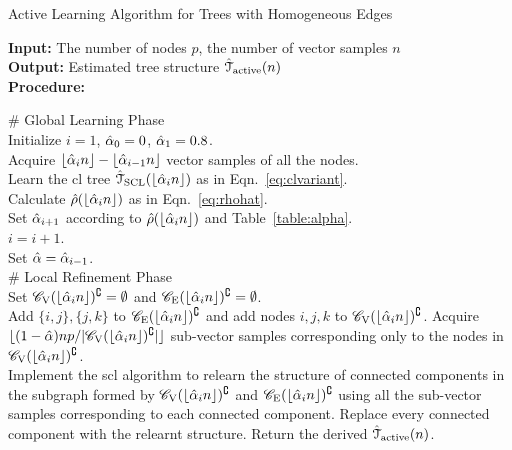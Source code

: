 \begin{algorithm}[t]
	\caption{Active Learning Algorithm for Trees with Homogeneous Edges}
	\textbf{Input:}  The number of nodes $p$, the number of vector samples $n$\\
	\textbf{Output:} Estimated tree structure $\hat{\mathcal{T}}_{{\rm active}}(n)$ \\
	\textbf{Procedure:}
	\begin{algorithmic}[1]\label{algo:alathe}
		\STATE \# Global Learning Phase\\
		\STATE Initialize $i=1$, $\hat{\alpha}_{0}=0$, $\hat{\alpha}_{1}=0.8$.\\
			\STATE Acquire $\lfloor\hat{\alpha}_{i}n\rfloor-\lfloor\hat{\alpha}_{i-1}n\rfloor$ vector samples of all the nodes.\\
			\STATE Learn the \ac{cl} tree $\hat{\mathcal{T}}_{\rm{SCL}}(\lfloor\hat{\alpha}_{i}n\rfloor)$ as in Eqn.~\eqref{eq:clvariant}.\\
			\STATE Calculate $\hat{\rho}(\lfloor\hat{\alpha}_{i}n\rfloor)$ as in Eqn.~\eqref{eq:rhohat}.\\
			\STATE Set $\hat{\alpha}_{i+1}$ according to $\hat{\rho}(\lfloor\hat{\alpha}_{i}n\rfloor)$ and Table~\ref{table:alpha}.\\
			\STATE $i=i+1$.\\
		\ENDWHILE
		\STATE Set $\hat{\alpha}=\hat{\alpha}_{i-1}$. \\%
		\STATE \# Local Refinement Phase\\
		\STATE Set $\mathscr{C}_{\mathrm{V}}(\lfloor\hat{\alpha}_{i}n\rfloor)^{\complement}=\emptyset$ and $\mathscr{C}_{\mathrm{E}}(\lfloor\hat{\alpha}_{i}n\rfloor)^{\complement}=\emptyset$.\\
				\STATE Add $\{i,j\},\{j,k\}$ to $\mathscr{C}_{\mathrm{E}}(\lfloor\hat{\alpha}_{i}n\rfloor)^{\complement}$ and add nodes $i,j,k$ to $\mathscr{C}_{\mathrm{V}}(\lfloor\hat{\alpha}_{i}n\rfloor)^{\complement}$.
			\ENDIF
		\ENDFOR
		\STATE Acquire $\lfloor(1-\hat{\alpha})np/|\mathscr{C}_{\mathrm{V}}(\lfloor\hat{\alpha}_{i}n\rfloor)^{\complement}| \rfloor$  sub-vector samples corresponding only to the nodes in $\mathscr{C}_{\mathrm{V}}(\lfloor\hat{\alpha}_{i}n\rfloor)^{\complement}$.\\
		\STATE Implement the \ac{scl} algorithm to relearn the structure of connected components in the subgraph formed by $\mathscr{C}_{\mathrm{V}}(\lfloor\hat{\alpha}_{i}n\rfloor)^{\complement}$ and $\mathscr{C}_{\mathrm{E}}(\lfloor\hat{\alpha}_{i}n\rfloor)^{\complement}$ using all the sub-vector samples corresponding to each connected component.
		\STATE Replace every connected component with the relearnt structure.
		\STATE Return the derived $\hat{\mathcal{T}}_{{\rm active}}(n)$.
	\end{algorithmic}
\end{algorithm}
